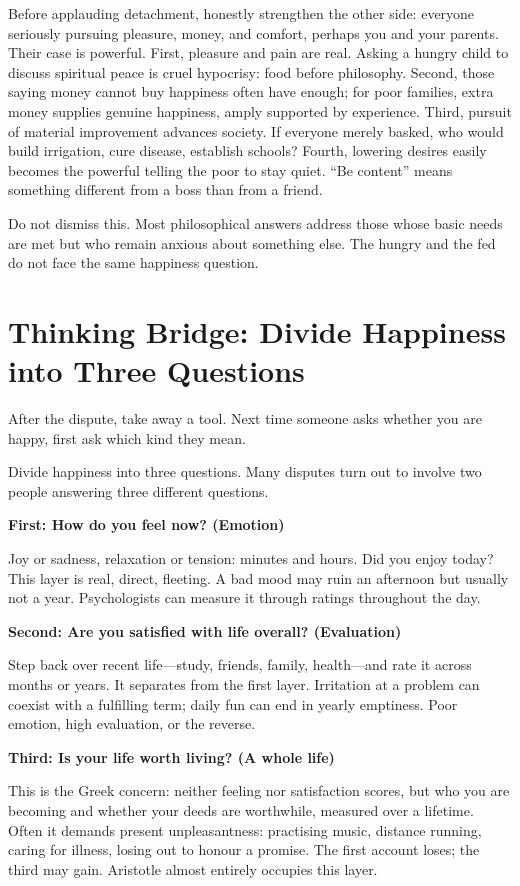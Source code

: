 Before applauding detachment, honestly strengthen the other side: everyone seriously pursuing pleasure, money, and comfort, perhaps you and your parents. Their case is powerful. First, pleasure and pain are real. Asking a hungry child to discuss spiritual peace is cruel hypocrisy: food before philosophy. Second, those saying money cannot buy happiness often have enough; for poor families, extra money supplies genuine happiness, amply supported by experience. Third, pursuit of material improvement advances society. If everyone merely basked, who would build irrigation, cure disease, establish schools? Fourth, lowering desires easily becomes the powerful telling the poor to stay quiet. ``Be content'' means something different from a boss than from a friend.

Do not dismiss this. Most philosophical answers address those whose basic needs are met but who remain anxious about something else. The hungry and the fed do not face the same happiness question.

\section[Thinking Bridge: Three Happiness Questions]{Thinking Bridge: Divide Happiness into Three Questions}
After the dispute, take away a tool. Next time someone asks whether you are happy, first ask which kind they mean.

Divide happiness into three questions. Many disputes turn out to involve two people answering three different questions.

\textbf{First: How do you feel now? (Emotion)}

Joy or sadness, relaxation or tension: minutes and hours. Did you enjoy today? This layer is real, direct, fleeting. A bad mood may ruin an afternoon but usually not a year. Psychologists can measure it through ratings throughout the day.

\textbf{Second: Are you satisfied with life overall? (Evaluation)}

Step back over recent life---study, friends, family, health---and rate it across months or years. It separates from the first layer. Irritation at a problem can coexist with a fulfilling term; daily fun can end in yearly emptiness. Poor emotion, high evaluation, or the reverse.

\textbf{Third: Is your life worth living? (A whole life)}

This is the Greek concern: neither feeling nor satisfaction scores, but who you are becoming and whether your deeds are worthwhile, measured over a lifetime. Often it demands present unpleasantness: practising music, distance running, caring for illness, losing out to honour a promise. The first account loses; the third may gain. Aristotle almost entirely occupies this layer.

